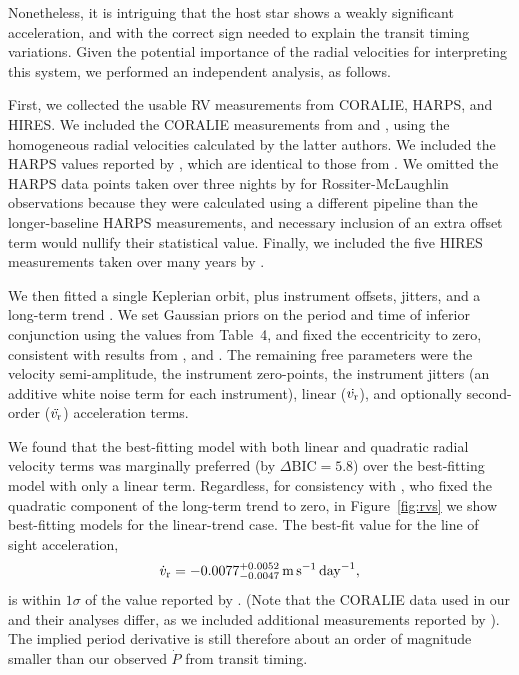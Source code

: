 \documentclass[12pt,twocolumn,tighten]{aastex62}
\begin{document}
Nonetheless, it is intriguing that the host star shows a weakly
significant acceleration, and with the correct sign needed to explain
the transit timing variations.  Given the potential importance of the
radial velocities for interpreting this system, we performed an
independent analysis, as follows.  

First, we collected the usable RV measurements from CORALIE, HARPS,
and HIRES.  We included the CORALIE measurements from
\citet{wilson_wasp-4b_2008} and \citet{triaud_spin-orbit_2010}, using
the homogeneous radial velocities calculated by the latter authors. We
included the HARPS values reported by \citet{pont_determining_2011},
which are identical to those from \citet{husnoo_observational_2012}.
We omitted the HARPS data points taken over three nights by
\citet{triaud_spin-orbit_2010} for Rossiter-McLaughlin observations
because they were calculated using a different pipeline than the
longer-baseline \citeauthor{pont_determining_2011} HARPS measurements,
and necessary inclusion of an extra offset term would nullify their
statistical value.  Finally, we included the five HIRES measurements
taken over many years by \citet{knutson_friends_2014}.  

We then fitted a single Keplerian orbit, plus instrument offsets,
jitters, and a long-term trend
\citep[][\texttt{radvel}]{fulton_radvel_2018}.  We set Gaussian priors
on the period and time of inferior conjunction using the values from
Table~4, and fixed the eccentricity to zero, consistent with results
from \citet{beerer_secondary_2011}, \citet{knutson_friends_2014} and
\citet{bonomo_gaps_2017}.  The remaining free parameters were the
velocity semi-amplitude, the instrument zero-points, the instrument
jitters (an additive white noise term for each instrument), linear
($\dot{v_{\rm r}}$), and optionally second-order ($\ddot{v_{\rm r}}$)
acceleration terms.

We found that the best-fitting model with both linear and quadratic
radial velocity terms was marginally preferred (by $\Delta
\mathrm{BIC} = 5.8$) over the best-fitting model with only a linear
term.  Regardless, for consistency with \citet{knutson_friends_2014},
who fixed the quadratic component of the long-term trend to zero, in
Figure~\ref{fig:rvs} we show best-fitting models for the linear-trend
case.  The best-fit value for the line of sight acceleration,
\begin{equation}
  \dot{v}_{\rm r} =
     -0.0077^{+0.0052}_{-0.0047}
     \,{\rm m}\,{\rm s}^{-1}\,{\rm day}^{-1},
\end{equation}
is within $1\sigma$ of the value reported by
\citet{knutson_friends_2014}. (Note that the CORALIE data used in our
and their analyses differ, as we included additional measurements
reported by \citealt{triaud_spin-orbit_2010}).  The implied period
derivative is still therefore about an order of magnitude smaller than
our observed $\dot{P}$ from transit timing.
\end{document}
